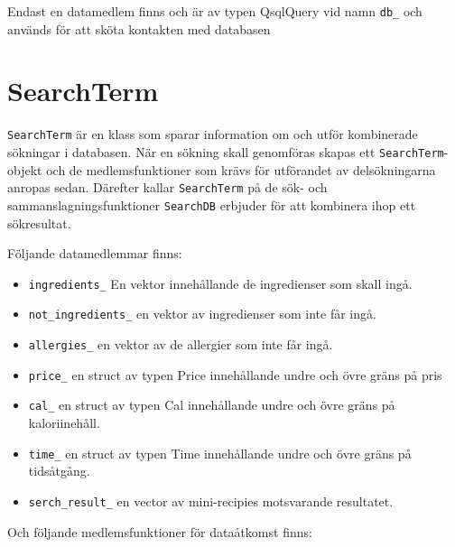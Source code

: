 Endast en datamedlem finns och är av typen QsqlQuery vid namn \verb+db_+ och
används för att sköta kontakten med databasen


\section{SearchTerm}

\verb+SearchTerm+ är en klass som sparar information om och utför kombinerade sökningar i databasen. När en sökning skall genomföras skapas ett \verb+SearchTerm+-objekt och de medlemsfunktioner som krävs för utförandet av delsökningarna anropas sedan. Därefter kallar \verb+SearchTerm+ på de sök- och sammanslagningsfunktioner \verb+SearchDB+ erbjuder för att kombinera ihop ett sökresultat. 

Följande datamedlemmar finns:

\begin{itemize}
\item \verb+ingredients_+ En vektor innehållande de ingredienser som skall ingå.

\item \verb+not_ingredients_+ en vektor av ingredienser som inte får ingå.

\item \verb+allergies_+ en vektor av de allergier som inte får ingå.

\item \verb+price_+ en struct av typen Price innehållande undre och övre gräns på pris

\item \verb+cal_+ en struct av typen Cal innehållande undre och övre gräns på kaloriinehåll.

\item \verb+time_+ en struct av typen Time innehållande undre och övre gräns på tidsåtgång.

\item \verb+serch_result_+ en vector av mini-recipies motsvarande resultatet.

\end{itemize}

Och följande medlemsfunktioner för dataåtkomst finns:


